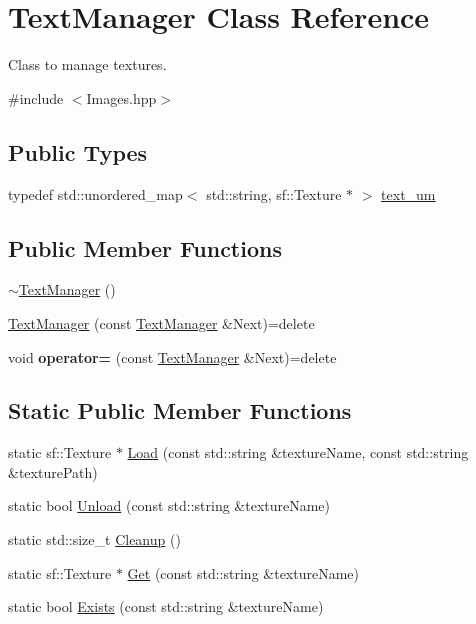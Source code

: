 \hypertarget{class_text_manager}{}\section{Text\+Manager Class Reference}
\label{class_text_manager}


Class to manage textures.  




{\ttfamily \#include $<$Images.\+hpp$>$}

\subsection*{Public Types}
\begin{DoxyCompactItemize}
\item 
typedef std\+::unordered\+\_\+map$<$ std\+::string, sf\+::\+Texture $\ast$ $>$ \mbox{\hyperlink{class_text_manager_ab982469e25633e1e17ef8fffa96712ac}{text\+\_\+um}}
\end{DoxyCompactItemize}
\subsection*{Public Member Functions}
\begin{DoxyCompactItemize}
\item 
\mbox{\hyperlink{class_text_manager_a9176b8e0ebb67704649e5f7869b36317}{$\sim$\+Text\+Manager}} ()
\item 
\mbox{\hyperlink{class_text_manager_a399a24e6fd8323b89ef6f72e3402b122}{Text\+Manager}} (const \mbox{\hyperlink{class_text_manager}{Text\+Manager}} \&Next)=delete
\item 
\mbox{\label{class_text_manager_a357d86c0ca83daa726b49a87ba95a3f8}} 
void {\bfseries operator=} (const \mbox{\hyperlink{class_text_manager}{Text\+Manager}} \&Next)=delete
\end{DoxyCompactItemize}
\subsection*{Static Public Member Functions}
\begin{DoxyCompactItemize}
\item 
static sf\+::\+Texture $\ast$ \mbox{\hyperlink{class_text_manager_a1c84d24abb82f311818f38e4f9c635df}{Load}} (const std\+::string \&texture\+Name, const std\+::string \&texture\+Path)
\item 
static bool \mbox{\hyperlink{class_text_manager_a3af7a053bdcd759d13d2759c3434a4a1}{Unload}} (const std\+::string \&texture\+Name)
\item 
static std\+::size\+\_\+t \mbox{\hyperlink{class_text_manager_a49d82957f1c2915df70ba01b8ba1eb99}{Cleanup}} ()
\item 
static sf\+::\+Texture $\ast$ \mbox{\hyperlink{class_text_manager_a67f615b512e31f77d93be69715876d31}{Get}} (const std\+::string \&texture\+Name)
\item 
static bool \mbox{\hyperlink{class_text_manager_a2d7c607da9112ef63ae84d4b9d8bd5cd}{Exists}} (const std\+::string \&texture\+Name)
\end{DoxyCompactItemize}
